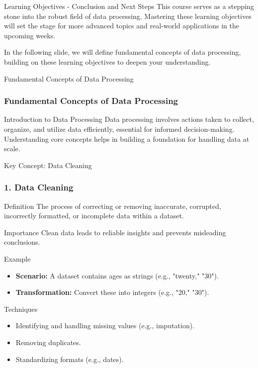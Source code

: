 \documentclass[aspectratio=169]{beamer}
\begin{document}
\begin{frame}[fragile]{Learning Objectives - Conclusion and Next Steps}
    This course serves as a stepping stone into the robust field of data processing. 
    Mastering these learning objectives will set the stage for more advanced topics and real-world applications in the upcoming weeks.
    
    In the following slide, we will define fundamental concepts of data processing, building on these learning objectives to deepen your understanding.
\end{frame}

\begin{frame}{Fundamental Concepts of Data Processing}
    \frametitle{Fundamental Concepts of Data Processing}
    \begin{block}{Introduction to Data Processing}
        Data processing involves actions taken to collect, organize, and utilize data efficiently, essential for informed decision-making. 
        Understanding core concepts helps in building a foundation for handling data at scale.
    \end{block}
\end{frame}

\begin{frame}{Key Concept: Data Cleaning}
    \frametitle{1. Data Cleaning}
    \begin{block}{Definition}
        The process of correcting or removing inaccurate, corrupted, incorrectly formatted, or incomplete data within a dataset.
    \end{block}
    
    \begin{block}{Importance}
        Clean data leads to reliable insights and prevents misleading conclusions.
    \end{block}
    
    \begin{block}{Example}
        \begin{itemize}
            \item \textbf{Scenario:} A dataset contains ages as strings (e.g., "twenty," "30"). 
            \item \textbf{Transformation:} Convert these into integers (e.g., "20," "30").
        \end{itemize}
    \end{block}
    
    \begin{block}{Techniques}
        \begin{itemize}
            \item Identifying and handling missing values (e.g., imputation).
            \item Removing duplicates.
            \item Standardizing formats (e.g., dates).
        \end{itemize}
    \end{block}
\end{frame}
\end{document}
